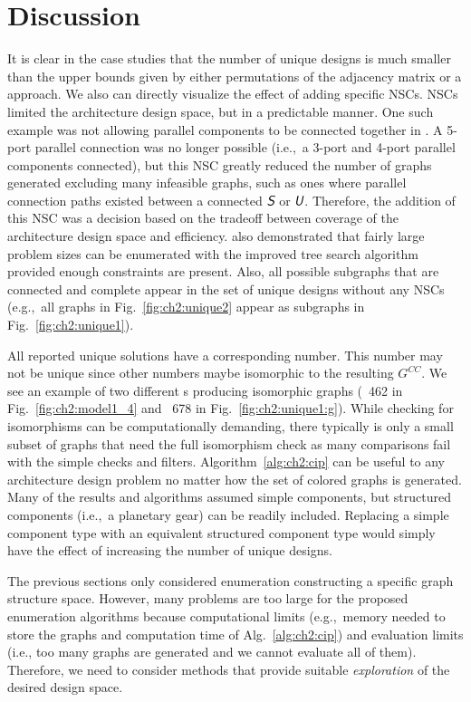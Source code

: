 \section{Discussion}

It is clear in the case studies that the number of unique designs is much smaller than the upper bounds given by either permutations of the adjacency matrix or a \mypm{} approach. We also can directly visualize the effect of adding specific NSCs. NSCs limited the architecture design space, but in a predictable manner. One such example was not allowing parallel components to be connected together in . A 5-port parallel connection was no longer possible (i.e.,~a 3-port and 4-port parallel components connected), but this NSC greatly reduced the number of graphs generated excluding many infeasible graphs, such as ones where parallel connection paths existed between a connected $\textsl{\textsf{S}}$ or $\textsl{\textsf{U}}$. Therefore, the addition of this NSC was a decision based on the tradeoff between  coverage of the architecture design space and efficiency.
 also demonstrated that fairly large problem sizes can be enumerated with the improved tree search algorithm provided enough constraints are present. Also, all possible subgraphs that are connected and complete appear in the set of unique designs without any NSCs (e.g.,~all graphs in Fig.~\ref{fig:ch2:unique2} appear as subgraphs in Fig.~\ref{fig:ch2:unique1}).

All reported unique solutions have a corresponding \mypm{} number. This number may not be unique since other \mypm{} numbers maybe isomorphic to the resulting $G^{CC}$. We see an example of two different \mypm{}s producing isomorphic graphs (\mypm{}~462 in Fig.~\ref{fig:ch2:model1_4} and \mypm{}~678 in Fig.~\ref{fig:ch2:unique1:g}).
While checking for isomorphisms can be computationally demanding, there typically is only a small subset of graphs that need the full isomorphism check as many comparisons fail with the simple checks and filters. Algorithm~\ref{alg:ch2:cip} can be useful to any architecture design problem no matter how the set of colored graphs is generated.
Many of the results and algorithms assumed simple components, but structured components (i.e.,~a planetary gear) can be readily included. Replacing a simple component type with an equivalent structured component type would simply have the effect of increasing the number of unique designs.

The previous sections only considered enumeration constructing a specific graph structure space. However, many problems are too large for the proposed enumeration algorithms because computational limits (e.g.,~memory needed to store the graphs and computation time of Alg.~\ref{alg:ch2:cip}) and evaluation limits (i.e., too many graphs are generated and we cannot evaluate all of them). Therefore, we need to consider methods that provide suitable \textit{exploration} of the desired design space.

